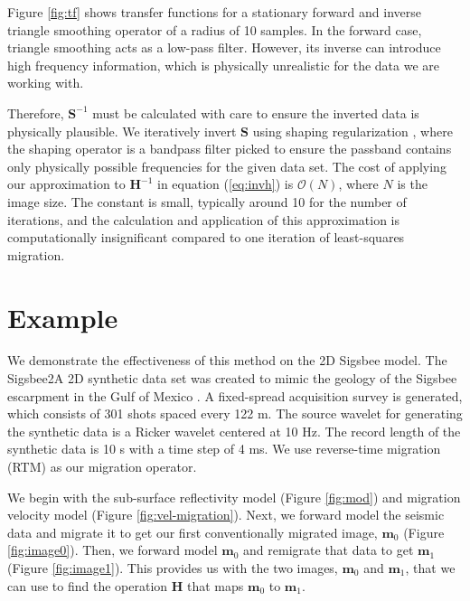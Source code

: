 
    Figure \ref{fig:tf} shows transfer functions for a stationary forward and inverse triangle smoothing operator of a radius of 10 samples.
    In the forward case, triangle smoothing acts as a low-pass filter.
    However, its inverse can introduce high frequency information, which is physically unrealistic for the data we are working with.


    Therefore, $\mathbf{S}^{-1}$ must be calculated with care to ensure the inverted data is physically plausible. 
    We iteratively invert $\mathbf{S}$ using shaping regularization \cite[]{shap}, where the shaping operator is a bandpass filter picked to ensure the passband contains only physically possible frequencies for the given data set.
    The cost of applying our approximation to $\mathbf{H}^{-1}$ in equation (\ref{eq:invh}) is $\mathcal{O}(N)$, where $N$ is the image size. 
    The constant is small, typically around 10 for the number of iterations, and the calculation and application of this approximation is computationally insignificant compared to one iteration of least-squares migration. 

\section{Example}

    We demonstrate the effectiveness of this method on the 2D Sigsbee model. 
    The Sigsbee2A 2D synthetic data set was created to mimic the geology of the Sigsbee escarpment in the Gulf of Mexico \cite[]{sigsbee}.
    A fixed-spread acquisition survey is generated, which consists of 301 shots spaced every 122 m.
    The source wavelet for generating the synthetic data is a Ricker wavelet centered at 10 Hz.
    The record length of the synthetic data is 10 s with a time step of 4 ms.
We use reverse-time migration (RTM) as our migration operator.


    We begin with the sub-surface reflectivity model (Figure \ref{fig:mod}) and migration velocity model (Figure \ref{fig:vel-migration}).
    Next, we forward model the seismic data and migrate it to get our first conventionally migrated image, $\mathbf{m}_0$ (Figure \ref{fig:image0}). 
    Then, we forward model $\mathbf{m}_0$ and remigrate that data to get $\mathbf{m}_1$ (Figure \ref{fig:image1}).
    This provides us with the two images, $\mathbf{m}_0$ and $\mathbf{m}_1$, that we can use to find the operation $\mathbf{H}$ that maps $\mathbf{m}_0$ to $\mathbf{m}_1$.


